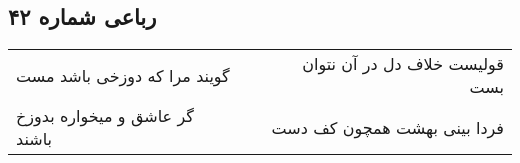 \begin{center}
\section*{رباعی شماره ۴۲}
\label{sec:sh042}
\begin{longtable}{l p{0.5cm} r}
گویند مرا که دوزخی باشد مست
&&
قولیست خلاف دل در آن نتوان بست
\\
گر عاشق و میخواره بدوزخ باشند
&&
فردا بینی بهشت همچون کف دست
\\
\end{longtable}
\end{center}
